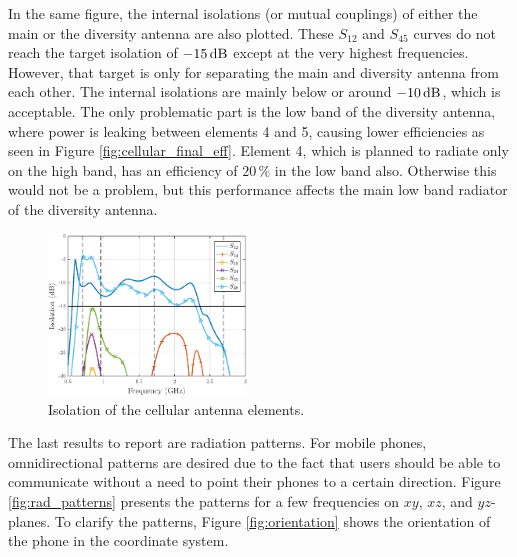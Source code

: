 In the same figure, the internal isolations (or mutual couplings) of either the main or the diversity antenna are also plotted. These $S_{12}$ and $S_{45}$ curves do not reach the target isolation of $-15\,\mathrm{dB}$ except at the very highest frequencies. However, that target is only for separating the main and diversity antenna from each other. The internal isolations are mainly below or around $-10\,\mathrm{dB}$, which is acceptable. The only problematic part is the low band of the diversity antenna, where power is leaking between elements 4 and 5, causing lower efficiencies as seen in Figure \ref{fig:cellular_final_eff}. Element 4, which is planned to radiate only on the high band, has an efficiency of $20\,\%$ in the low band also. Otherwise this would not be a problem, but this performance affects the main low band radiator of the diversity antenna.
\begin{figure}[H]
    \centering
    \vspace{-10pt}
    \includegraphics[width=0.47\textwidth]{img/isolation_match_wgps.eps}
    \vspace{-7pt}
    \caption{Isolation of the cellular antenna elements.}
    \label{fig:isolation}
    \vspace{-15pt}
\end{figure}

The last results to report are radiation patterns. For mobile phones, omnidirectional patterns are desired due to the fact that users should be able to communicate without a need to point their phones to a certain direction. Figure \ref{fig:rad_patterns} presents the patterns for a few frequencies on $xy$, $xz$, and $yz$-planes. To clarify the patterns, Figure \ref{fig:orientation} shows the orientation of the phone in the coordinate system.

